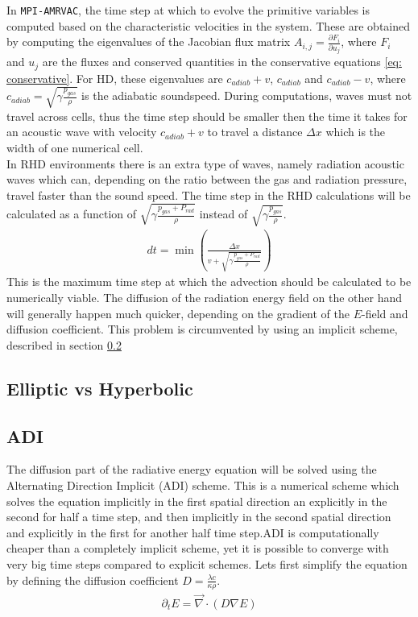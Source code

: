 In \texttt{MPI-AMRVAC}, the time step at which to evolve the primitive variables is computed based on the characteristic velocities in the system. These are obtained by computing the eigenvalues of the Jacobian flux matrix $A_{i,j} = \frac{\partial F_i}{\partial u_j}$, where $F_i$ and $u_j$ are the fluxes and conserved quantities in the conservative equations \eqref{eq: conservative}. For HD, these eigenvalues are $c_{adiab} + v$, $c_{adiab}$ and $c_{adiab} - v$, where $c_{adiab} = \sqrt{\gamma\frac{p_{gas}}{\rho}}$ is the adiabatic soundspeed. During computations, waves must not travel across cells, thus the time step should be smaller then the time it takes for an acoustic wave with velocity $c_{adiab} + v$ to travel a distance $\Delta x$ which is the width of one numerical cell.\\

In RHD environments there is an extra type of waves, namely radiation acoustic waves \cite{Mihalas1984a} which can, depending on the ratio between the gas and radiation pressure, travel faster than the sound speed. The time step in the RHD calculations will be calculated as a function of $\sqrt{\gamma\frac{p_{gas} + P_{rad}}{\rho}}$ instead of $\sqrt{\gamma\frac{p_{gas}}{\rho}}$.
\begin{align}
dt = \min \left(\frac{\Delta x}{v + \sqrt{\gamma\frac{p_{gas} + P_{rad}}{\rho}}} \right)
\end{align}
This is the maximum time step at which the advection should be calculated to be numerically viable. The diffusion of the radiation energy field on the other hand will generally happen much quicker, depending on the gradient of the $E$-field and diffusion coefficient. This problem is circumvented by using an implicit scheme, described in section \ref{section: m: ADI}

\subsection{Elliptic vs Hyperbolic}
\subsection{ADI} \label{section: m: ADI}
The diffusion part of the radiative energy equation will be solved using the Alternating Direction Implicit (ADI) scheme. This is a numerical scheme which solves the equation implicitly in the first spatial direction an explicitly in the second for half a time step, and then implicitly in the second spatial direction and explicitly in the first for another half time step.ADI is computationally cheaper than a completely implicit scheme, yet it is possible to converge with very big time steps compared to explicit schemes. Lets first simplify the equation by defining the diffusion coefficient $D = \frac{\lambda c}{\kappa \rho}$. 
\begin{align}
\partial_t E  = \vec{\nabla} \cdot \left(D \nabla E\right) \label{eq: diffusion}
\end{align}


